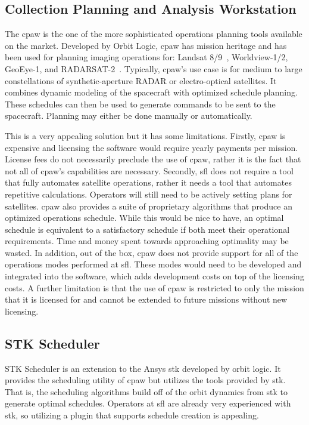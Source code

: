 \subsection{Collection Planning and Analysis Workstation}

The \acrfull{cpaw} is the one of the more sophisticated operations planning
tools available on the market.  Developed by Orbit Logic, \gls{cpaw} has
mission heritage and has been used for planning imaging operations for: Landsat
8/9~\cite{gokhale_mission_2019}, Worldview-1/2, GeoEye-1, and
RADARSAT-2~\cite{herz_eo_2014}.  Typically, \gls{cpaw}'s use case is for medium
to large constellations of synthetic-aperture RADAR or electro-optical
satellites. It combines dynamic modeling of the spacecraft with optimized
schedule planning. These schedules can then be used to generate commands to be
sent to the spacecraft. Planning may either be done manually or automatically. 

This is a very appealing solution but it has some limitations. Firstly,
\gls{cpaw} is expensive and licensing the software would require yearly
payments per mission. License fees do not necessarily preclude the use of
\gls{cpaw}, rather it is the fact that not all of \gls{cpaw}'s capabilities are
necessary. Secondly, \gls{sfl} does not require a tool that fully automates
satellite operations, rather it needs a tool that automates repetitive
calculations.  Operators will still need to be actively setting plans for
satellites.  \gls{cpaw} also provides a suite of proprietary algorithms that
produce an optimized operations schedule.  While this would be nice to have, an
optimal schedule is equivalent to a satisfactory schedule if both meet their
operational requirements. Time and money spent towards approaching optimality
may be wasted. In addition, out of the box, \gls{cpaw} does not provide support
for all of the operations modes performed at \gls{sfl}. These modes would need
to be developed and integrated into the software, which adds development costs
on top of the licensing costs. A further limitation is that the use of
\gls{cpaw} is restricted to only the mission that it is licensed for and cannot
be extended to future missions without new licensing.


\subsection{STK Scheduler} 

STK Scheduler is an extension to the Ansys \acrlong{stk} developed by orbit
logic. It provides the scheduling utility of \gls{cpaw} but utilizes the tools
provided by \gls{stk}. That is, the scheduling algorithms build off of the
orbit dynamics from \gls{stk} to generate optimal schedules. Operators at
\gls{sfl} are already very experienced with \gls{stk}, so utilizing a plugin
that supports schedule creation is appealing.

